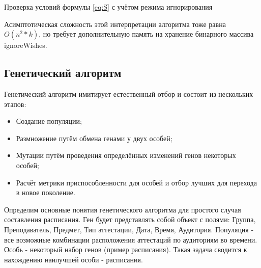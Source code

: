 \begin{algorithm} 
	\nonl{}
	\caption{Проверка условий формулы \eqref{eq:S} с учётом режима игнорирования}\label{alg:algoFindNextPr}
\end{algorithm} 
Асимптотическая сложность этой интерпретации алгоритма тоже равна ${O(n^2 * k)}$, но требует дополнительную память на хранение бинарного массива ignoreWishes. 
\FloatBarrier

\subsection{Генетический алгоритм}
Генетический алгоритм имитирует естественный отбор и состоит из нескольких этапов:
\begin{itemize}
	\item Создание популяции;
	\item Размножение путём обмена генами у двух особей;
	\item Мутации путём проведения определённых изменений генов некоторых особей;
	\item Расчёт метрики приспособленности для особей и отбор лучших для перехода в новое поколение.
\end{itemize}

Определим основные понятия генетического алгоритма для простого случая составления расписания. Ген будет представлять собой объект с полями: Группа, Преподаватель, Предмет, Тип аттестации, Дата, Время, Аудитория. Популяция - все возможные комбинации расположения аттестаций по аудиториям во времени. Особь - некоторый набор генов (пример расписания). Такая задача сводится к нахождению наилучшей особи - расписания.

